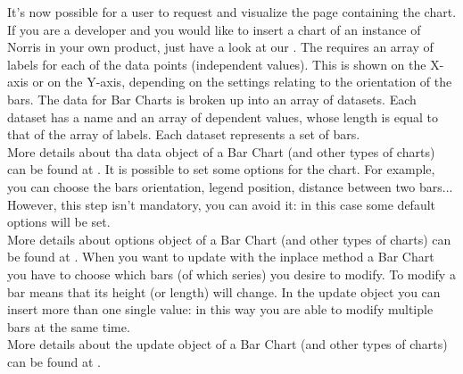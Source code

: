 		It's now possible for a user to request and visualize the page containing the chart.\\
		If you are a developer and you would like to insert a chart of an instance of Norris in your own product, just have a look at our .
			The  requires an array of labels for each of the data points (independent values). This is shown on the X-axis or on the Y-axis, depending on the settings relating to the orientation of the bars. The data for Bar Charts is broken up into an array of datasets. Each dataset has a name and an array of dependent values, whose length is equal to that of the array of labels. Each dataset represents a set of bars.\\
			More details about tha data object of a Bar Chart (and other types of charts) can be found at .
			It is possible to set some options for the chart. For example, you can choose the bars orientation, legend position, distance between two bars... However, this step isn't mandatory, you can avoid it: in this case some default options will be set.\\
			More details about options object of a Bar Chart (and other types of charts) can be found at .
			When you want to update with the inplace method a Bar Chart you have to choose which bars (of which series) you desire to modify. To modify a bar means that its height (or length) will change. In the update object you can insert more than one single value: in this way you are able to modify multiple bars at the same time.\\
			More details about the update object of a Bar Chart (and other types of charts) can be found at .
